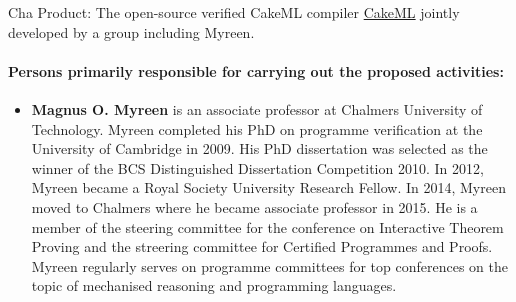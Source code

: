 \begin{sitedescription}{Cha}
Product: The open-source verified CakeML compiler \href{https://cakeml.org/}{CakeML}
jointly developed by a group including Myreen.

\paragraph{Persons primarily responsible for carrying out the proposed activities:}

\begin{itemize}
\item \textbf{Magnus O. Myreen} is an associate professor at Chalmers
  University of Technology.  Myreen completed his PhD on programme
  verification at the University of Cambridge in 2009. His PhD
  dissertation was selected as the winner of the BCS Distinguished
  Dissertation Competition 2010. In 2012, Myreen became a Royal
  Society University Research Fellow. In 2014, Myreen moved to
  Chalmers where he became associate professor in 2015.  He is a
  member of the steering committee for the conference on Interactive
  Theorem Proving and the streering committee for Certified Programmes
  and Proofs.  Myreen regularly serves on programme committees for top
  conferences on the topic of mechanised reasoning and programming
  languages.
\end{itemize}

\end{sitedescription}

